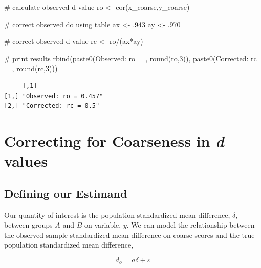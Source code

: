 \documentclass[
  letterpaper,
  DIV=11,
  numbers=noendperiod]{scrreprt}
\newenvironment{Shaded}{\begin{snugshade}}{\end{snugshade}}
\newcommand{\CommentTok}[1]{\textcolor[rgb]{0.37,0.37,0.37}{#1}}
\newcommand{\DecValTok}[1]{\textcolor[rgb]{0.68,0.00,0.00}{#1}}
\newcommand{\FunctionTok}[1]{\textcolor[rgb]{0.28,0.35,0.67}{#1}}
\newcommand{\NormalTok}[1]{\textcolor[rgb]{0.00,0.23,0.31}{#1}}
\newcommand{\OtherTok}[1]{\textcolor[rgb]{0.00,0.23,0.31}{#1}}
\newcommand{\SpecialCharTok}[1]{\textcolor[rgb]{0.37,0.37,0.37}{#1}}
\newcommand{\StringTok}[1]{\textcolor[rgb]{0.13,0.47,0.30}{#1}}
\begin{document}
\begin{Shaded}
\begin{Highlighting}[]
\CommentTok{\# calculate observed d value}
\NormalTok{ro }\OtherTok{\textless{}{-}} \FunctionTok{cor}\NormalTok{(x\_coarse,y\_coarse)}

\CommentTok{\# correct observed do using table}
\NormalTok{ax }\OtherTok{\textless{}{-}}\NormalTok{ .}\DecValTok{943}
\NormalTok{ay }\OtherTok{\textless{}{-}}\NormalTok{ .}\DecValTok{970}

\CommentTok{\# correct observed d value}
\NormalTok{rc }\OtherTok{\textless{}{-}}\NormalTok{ ro}\SpecialCharTok{/}\NormalTok{(ax}\SpecialCharTok{*}\NormalTok{ay)}

\CommentTok{\# print results}
\FunctionTok{rbind}\NormalTok{(}\FunctionTok{paste0}\NormalTok{(}\StringTok{\textquotesingle{}Observed: ro = \textquotesingle{}}\NormalTok{, }\FunctionTok{round}\NormalTok{(ro,}\DecValTok{3}\NormalTok{)),}
      \FunctionTok{paste0}\NormalTok{(}\StringTok{\textquotesingle{}Corrected: rc = \textquotesingle{}}\NormalTok{, }\FunctionTok{round}\NormalTok{(rc,}\DecValTok{3}\NormalTok{)))}
\end{Highlighting}
\end{Shaded}

\begin{verbatim}
     [,1]                  
[1,] "Observed: ro = 0.457"
[2,] "Corrected: rc = 0.5" 
\end{verbatim}

\hypertarget{correcting-for-coarseness-in-d-values}{%
\section{\texorpdfstring{Correcting for Coarseness in \emph{d}
values}{Correcting for Coarseness in d values}}\label{correcting-for-coarseness-in-d-values}}

\hypertarget{defining-our-estimand-6}{%
\subsection{Defining our Estimand}\label{defining-our-estimand-6}}

Our quantity of interest is the population standardized mean difference,
\(\delta\), between groups \(A\) and \(B\) on variable, \(y\). We can
model the relationship between the observed sample standardized mean
difference on coarse scores and the true population standardized mean
difference,

\[
d_o = a\delta+\varepsilon
\]
\end{document}
